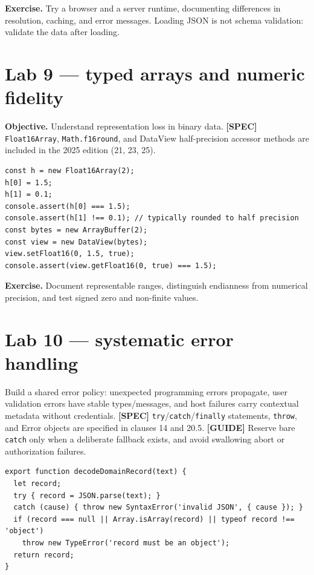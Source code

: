\documentclass[11pt,letterpaper]{article}
\newcommand{\passthrough}[1]{#1}
\begin{document}
\textbf{Exercise.} Try a browser and a server runtime, documenting differences in resolution, caching, and error messages. Loading JSON is not schema validation: validate the data after loading.

\section{Lab 9 --- typed arrays and numeric fidelity}\label{lab-9-typed-arrays-and-numeric-fidelity}

\textbf{Objective.} Understand representation loss in binary data. \textbf{{[}SPEC{]}} \passthrough{\lstinline!Float16Array!}, \passthrough{\lstinline!Math.f16round!}, and DataView half-precision accessor methods are included in the 2025 edition (21, 23, 25).

\begin{lstlisting}
const h = new Float16Array(2);
h[0] = 1.5;
h[1] = 0.1;
console.assert(h[0] === 1.5);
console.assert(h[1] !== 0.1); // typically rounded to half precision
const bytes = new ArrayBuffer(2);
const view = new DataView(bytes);
view.setFloat16(0, 1.5, true);
console.assert(view.getFloat16(0, true) === 1.5);
\end{lstlisting}

\textbf{Exercise.} Document representable ranges, distinguish endianness from numerical precision, and test signed zero and non-finite values.

\section{Lab 10 --- systematic error handling}\label{lab-10-systematic-error-handling}

Build a shared error policy: unexpected programming errors propagate, user validation errors have stable types/messages, and host failures carry contextual metadata without credentials. \textbf{{[}SPEC{]}} \passthrough{\lstinline!try!}/\passthrough{\lstinline!catch!}/\passthrough{\lstinline!finally!} statements, \passthrough{\lstinline!throw!}, and Error objects are specified in clauses 14 and 20.5. \textbf{{[}GUIDE{]}} Reserve bare \passthrough{\lstinline!catch!} only when a deliberate fallback exists, and avoid swallowing abort or authorization failures.

\begin{lstlisting}
export function decodeDomainRecord(text) {
  let record;
  try { record = JSON.parse(text); }
  catch (cause) { throw new SyntaxError('invalid JSON', { cause }); }
  if (record === null || Array.isArray(record) || typeof record !== 'object')
    throw new TypeError('record must be an object');
  return record;
}
\end{lstlisting}
\end{document}
